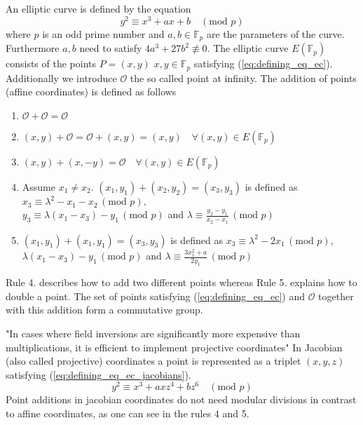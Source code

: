 An elliptic curve is defined by the equation
\begin{equation}\label{eq:defining_eq_ec}
y^2 \equiv x^3 + ax + b \quad (\text{mod } p)
\end{equation}
where $p$ is an odd prime number and $a,b \in \mathbb{F}_p$ are the parameters of the curve. Furthermore $a, b$ need to satisfy $4a^3 + 27b^2 \not\equiv 0$. The elliptic curve $E\left(\mathbb{F}_p\right)$ consists of the points $P=(x,y)$ $x,y \in \mathbb{F}_p$ satisfying (\ref{eq:defining_eq_ec}). Additionally we introduce $\mathcal{O}$ the so called point at infinity. The addition of points (affine coordinates) is defined as follows \cite{Brown:2009}
\begin{enumerate}
\item{$\mathcal{O} + \mathcal{O} = \mathcal{O}$}
\item{$(x,y) + \mathcal{O} = \mathcal{O} + (x,y) = (x,y) \quad \forall (x,y) \in E(\mathbb{F}_p)$}
\item{$(x,y) + (x,-y) = \mathcal{O} \quad \forall (x,y) \in E(\mathbb{F}_p)$}
\item{Assume  $x_1 \neq x_2$. $(x_1, y_1) + (x_2, y_2) = (x_3, y_3)$ is defined as $x_3 \equiv \lambda^2 - x_1 - x_2 \, (\text{mod } p),$ \\ $y_3 \equiv \lambda(x_1 - x_3) - y_1 \, (\text{mod } p)$ and $\lambda \equiv \frac{y_2 - y_1}{x_2 - x_1} \, (\text{mod } p)$}
\item{$(x_1, y_1) + (x_1, y_1) = (x_3, y_3)$ is defined as $x_3 \equiv \lambda^2 -2 x_1 \, (\text{mod } p)$, $\lambda (x_1 - x_3) - y_1  \, (\text{mod } p)$ and $\lambda \equiv \frac{3 x_1^2 + a}{2y_1} \, (\text{mod } p)$}
\end{enumerate}
Rule 4. describes how to add two different points whereas Rule 5. explains how to double a point. The set of points satisfying (\ref{eq:defining_eq_ec}) and $\mathcal{O}$ together with this addition form a commutative group.

"In cases where field inversions are significantly more expensive than multiplications, it is efficient to implement projective coordinates" \cite{Blake:1999} In Jacobian (also called projective) coordinates a point is represented as a triplet $(x,y,z)$ satisfying (\ref{eq:defining_eq_ec_jacobians}).
\begin{equation}\label{eq:defining_eq_ec_jacobians}
y^2 \equiv x^3 + axz^4 + bz^6 \quad (\text{mod } p)
\end{equation}
Point additions in jacobian coordinates \cite[p. 59-60]{Blake:1999} do not need modular divisions in contrast to affine coordinates, as one can see in the rules 4 and 5.

